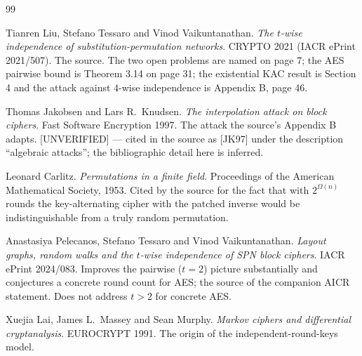 \documentclass{aicr-conjecture}
\newcommand{\Om}{\Omega}
\begin{document}
\begin{aicrbibliography}{99}

Tianren Liu, Stefano Tessaro and Vinod Vaikuntanathan.
\emph{The $t$-wise independence of substitution-permutation networks}.
CRYPTO 2021 (IACR ePrint 2021/507).
The source. The two open problems are named on page 7; the AES pairwise
bound is Theorem 3.14 on page 31; the existential KAC result is Section 4
and the attack against $4$-wise independence is Appendix B, page 46.

Thomas Jakobsen and Lars R.\ Knudsen.
\emph{The interpolation attack on block ciphers}.
Fast Software Encryption 1997.
The attack the source's Appendix B adapts. [UNVERIFIED] --- cited in the
source as [JK97] under the description ``algebraic attacks''; the
bibliographic detail here is inferred.

Leonard Carlitz.
\emph{Permutations in a finite field}.
Proceedings of the American Mathematical Society, 1953.
Cited by the source for the fact that with $2^{\Om(n)}$ rounds the
key-alternating cipher with the patched inverse would be
indistinguishable from a truly random permutation.

Anastasiya Pelecanos, Stefano Tessaro and Vinod Vaikuntanathan.
\emph{Layout graphs, random walks and the $t$-wise independence of SPN
block ciphers}.
IACR ePrint 2024/083.
Improves the pairwise ($t = 2$) picture substantially and conjectures a
concrete round count for AES\@; the source of the companion AICR
statement. Does not address $t > 2$ for concrete AES\@.

Xuejia Lai, James L.\ Massey and Sean Murphy.
\emph{Markov ciphers and differential cryptanalysis}.
EUROCRYPT 1991.
The origin of the independent-round-keys model.

\end{aicrbibliography}
\end{document}
